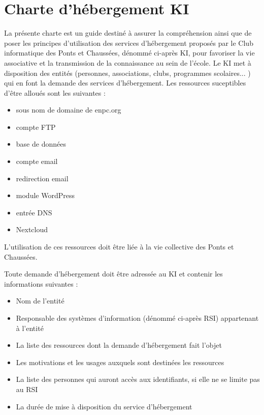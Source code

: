 \documentclass{ki019}
\begin{document}
\section{Charte d'hébergement KI}


La présente charte est un guide destiné à assurer la compréhension ainsi que de poser les principes d'utilisation des services d'hébergement proposés par le Club informatique des Ponts et Chaussées, dénommé ci-après KI, pour favoriser la vie associative et la transmission de la connaissance au sein de l'école. Le KI met à disposition des entités (personnes, associations, clubs, programmes scolaires... ) qui en font la demande des services d'hébergement. Les ressources suceptibles d'être alloués sont les suivantes :
\begin{itemize}
\item sous nom de domaine de enpc.org
\item compte FTP
\item base de données
\item compte email
\item redirection email
\item module WordPress
\item entrée DNS
\item Nextcloud
\end{itemize}

L'utilisation de ces ressources doit être liée à la vie collective des Ponts et Chaussées.



Toute demande d'hébergement doit être adressée au KI et contenir les informations suivantes :
\begin{itemize}
\item Nom de l'entité
\item Responsable des systèmes d'information (dénommé ci-après RSI) appartenant à l'entité
\item La liste des ressources dont la demande d'hébergement fait l'objet
\item Les motivations et les usages auxquels sont destinées les ressources
\item La liste des personnes qui auront accès aux identifiants, si elle ne se limite pas au RSI
\item La durée de mise à disposition du service d'hébergement
\end{itemize}
\end{document}
